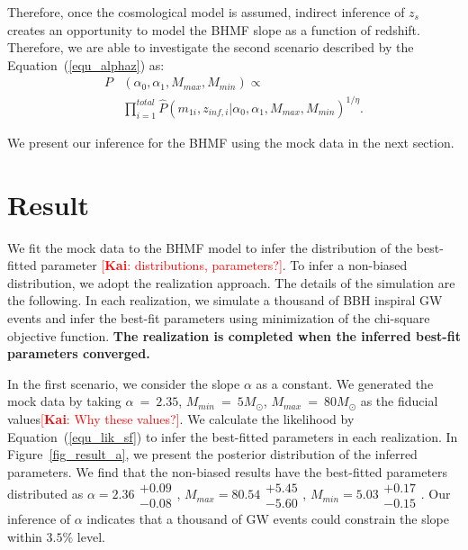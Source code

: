 \documentclass[twocolumn]{aastex62}
\newcommand{\kai}[1]{\textcolor{red}{[{\bf Kai}: #1]}}
\begin{document}
Therefore, once the cosmological model is assumed, indirect inference of $z_s$ creates an opportunity to model the BHMF slope as a function of redshift. Therefore, we are able to investigate the second scenario described by the Equation~(\ref{equ_alphaz}) as:
 \begin{equation} \label{equ_lik_alphaz}
 \begin{split}
 P&(\alpha_0, \alpha_1, M_{max}, M_{min}) \propto \\
  &\prod_{i=1}^{total} \hat{P}(m_{1i}, z_{inf,i} |\alpha_0, \alpha_1, M_{max}, M_{min})^{1/\eta}.
  \end{split}
 \end{equation}
 
 We present our inference for the BHMF using the mock data in the next section. 


\vspace{1cm}
\section{Result}\label{sec_result}
We fit the mock data to the BHMF model to infer the distribution of the best-fitted parameter \kai{distributions, parameters?}. To infer a non-biased distribution, we adopt the realization approach. The details of the simulation are the following. In each realization, we simulate a thousand of BBH inspiral GW events and infer the best-fit parameters using minimization of the chi-square objective function. 
\textbf{The realization is completed when the inferred best-fit parameters converged.} 

In the first scenario, we consider the slope $\alpha$ as a constant. We generated the mock data by taking $\alpha~=~2.35$, $M_{min}~=~5M_{\odot}$, $M_{max}~=~80M_{\odot}$ as the fiducial values\kai{Why these values?}. We calculate the likelihood by Equation~(\ref{equ_lik_sf}) to infer the best-fitted parameters in each realization. In Figure~\ref{fig_result_a}, we present the posterior distribution of the inferred parameters. We find that the non-biased results have the  best-fitted parameters distributed as $\alpha = 2.36\substack{+0.09\\-0.08}$, $M_{max} = 80.54\substack{+5.45\\-5.60}$,  $M_{min} = 5.03\substack{+0.17\\-0.15}$. Our inference of $\alpha$ indicates that a thousand of GW events could constrain the slope within $3.5\%$ level.
\end{document}
